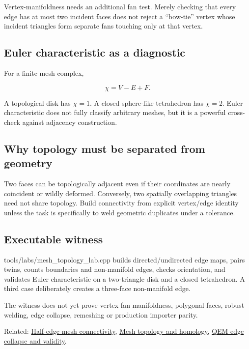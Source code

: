 Vertex-manifoldness needs an additional fan test. Merely checking that every edge has at most two incident faces does not reject a ``bow-tie'' vertex whose incident triangles form separate fans touching only at that vertex.

\subsection{Euler characteristic as a diagnostic}\label{euler-characteristic-as-a-diagnostic}

For a finite mesh complex,

\[
\chi = V-E+F.
\]

A topological disk has \(\chi=1\). A closed sphere-like tetrahedron has \(\chi=2\). Euler characteristic does not fully classify arbitrary meshes, but it is a powerful cross-check against adjacency construction.

\subsection{Why topology must be separated from geometry}\label{why-topology-must-be-separated-from-geometry}

Two faces can be topologically adjacent even if their coordinates are nearly coincident or wildly deformed. Conversely, two spatially overlapping triangles need not share topology. Build connectivity from explicit vertex/edge identity unless the task is specifically to weld geometric duplicates under a tolerance.

\subsection{Executable witness}\label{executable-witness}

tools/labs/mesh\_topology\_lab.cpp builds directed/undirected edge maps, pairs twins, counts boundaries and non-manifold edges, checks orientation, and validates Euler characteristic on a two-triangle disk and a closed tetrahedron. A third case deliberately creates a three-face non-manifold edge.

The witness does not yet prove vertex-fan manifoldness, polygonal faces, robust welding, edge collapse, remeshing or production importer parity.

Related: \hyperref[appendix-1aea26b2307f]{Half-edge mesh connectivity}, \hyperref[appendix-e38976cbbf86]{Mesh topology and homology}, \hyperref[appendix-89db9fe1bc8a]{QEM edge collapse and validity}.
